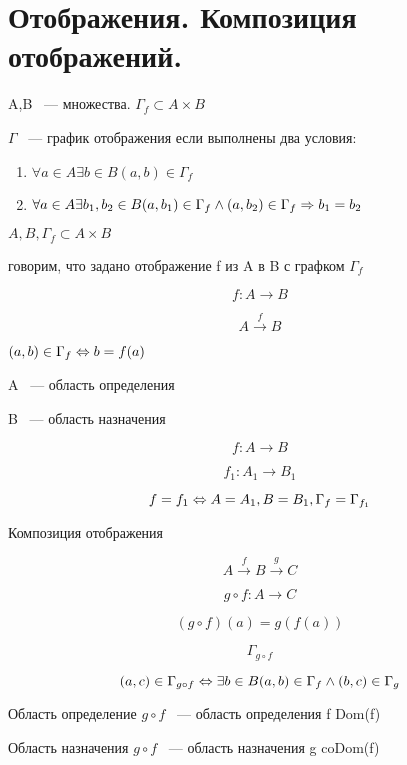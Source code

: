 ﻿\section{Отображения. Композиция отображений.}

\begin{Def}
A,B ~--- множества.
$\Gamma_{f} \subset A \times B$

$\Gamma$ ~--- график отображения если выполнены два условия:

\begin{enumerate}
\item $\forall a \in A \exists b \in B (a, b) \in \Gamma_{f}$
\item $\forall a \in A \exists b_1, b_2 \in B (a, b_1) \in \Gamma_f \wedge (a, b_2) \in \Gamma_f \Rightarrow b_1 = b_2$
\end{enumerate} 
\end{Def}

\begin{Def}
$A, B, \Gamma_f \subset A \times B$

говорим, что задано отображение f из A в B с графком $\Gamma_f$

$$f:A \to B$$

$$A \xrightarrow{f} B$$

$(a, b) \in \Gamma_f \Leftrightarrow b = f(a)$

A ~--- область определения

B ~--- область назначения
\end{Def}

$$f: A \to B$$

$$f_1: A_1 \to B_1$$

$$f = f_1 \Leftrightarrow A = A_1, B = B_1, \Gamma_f = \Gamma_{f_1} $$

\begin{Def}{Композиция отображения}

$$A \xrightarrow{f} B \xrightarrow{g} C$$

$$g \circ f: A \to C$$

$$(g \circ f)(a) = g(f(a))$$

$$\Gamma_{g \circ f}$$

$$(a, c) \in \Gamma_{g \circ f} \Leftrightarrow \exists b \in B (a, b) \in \Gamma_{f} \wedge (b, c) \in \Gamma_g$$

Область определение $g \circ f$ ~--- область определения f Dom(f) 

Область назначения $g \circ f$ ~--- область назначения g coDom(f)

\end{Def}

